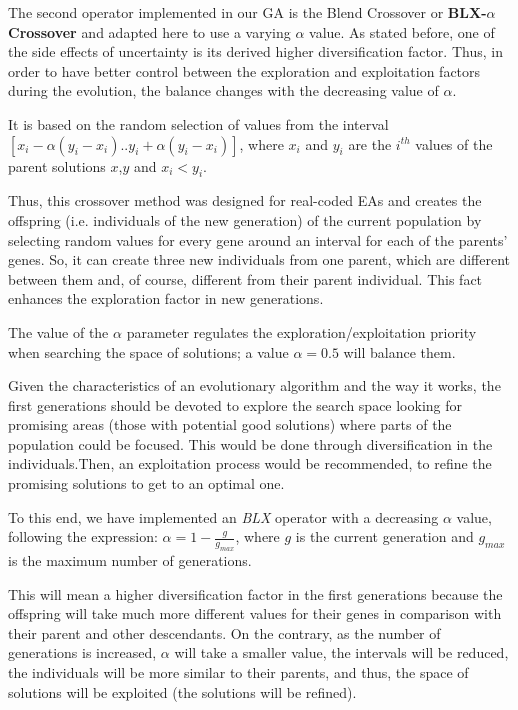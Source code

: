 \documentclass[10pt,journal,compsoc]{IEEEtran}
\begin{document}
The second operator implemented in our GA is the Blend Crossover or \textbf{BLX-$\alpha$ Crossover} \cite{blx2008} and adapted here to use a varying $\alpha$ value. As stated before, one of the side effects of uncertainty is its derived higher diversification factor. Thus, in order to have better control between the exploration and exploitation factors during the evolution, the balance changes with the decreasing value of $\alpha$.

It is based on the random selection of values from the interval
$[x_i-\alpha(y_i-x_i).. y_i+\alpha(y_i-x_i)]$, where $x_i$ and $y_i$
are the $i^{th}$ values of the parent solutions $x$,$y$ and
$x_i < y_i$. %


Thus, this crossover method was designed for real-coded EAs \cite{blx2008} and creates the offspring (i.e. individuals of the new generation) of the current population by selecting random values for every gene around an interval for each of the parents' genes. So, it can create three new individuals from one parent, which are different between them and, of course, different from their parent individual. This fact enhances the exploration factor in new generations.

The value of the $\alpha$ parameter regulates the exploration/exploitation priority when searching the space of solutions; a value $\alpha = 0.5$ will balance them.

Given the characteristics of an evolutionary algorithm and the way it works, the first generations should be devoted to explore the search space looking for promising areas (those with potential good solutions) where parts of the population could be focused. This would be done through diversification in the individuals.Then, an exploitation process would be recommended, to refine the promising solutions to get to an optimal one.

To this end, we have implemented an \textit{BLX} operator with a decreasing $\alpha$ value, following
the expression: \mbox{$\alpha =1-\frac{g}{g_{max}}$}, where $g$ is the
current generation and $g_{max}$ is the maximum number of generations.

This will mean a higher diversification factor in the first generations because the offspring will take much more different values for their genes in comparison with their parent and other descendants. 
On the contrary, as the number of generations is increased, $\alpha$ will take a smaller value, the intervals will be reduced, the individuals will be more similar to their parents, and thus, the space of solutions will be exploited (the solutions will be refined).
\end{document}
